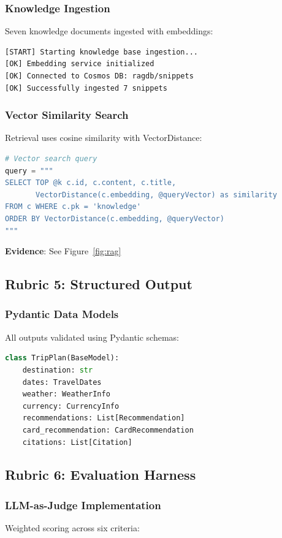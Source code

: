 \documentclass[11pt,a4paper]{article}
\begin{document}
\subsubsection{Knowledge Ingestion}
Seven knowledge documents ingested with embeddings:
\begin{lstlisting}[basicstyle=\ttfamily\small]
[START] Starting knowledge base ingestion...
[OK] Embedding service initialized
[OK] Connected to Cosmos DB: ragdb/snippets
[OK] Successfully ingested 7 snippets
\end{lstlisting}

\subsubsection{Vector Similarity Search}
Retrieval uses cosine similarity with VectorDistance:
\begin{lstlisting}[language=Python]
# Vector search query
query = """
SELECT TOP @k c.id, c.content, c.title,
       VectorDistance(c.embedding, @queryVector) as similarity
FROM c WHERE c.pk = 'knowledge'
ORDER BY VectorDistance(c.embedding, @queryVector)
"""
\end{lstlisting}
\textbf{Evidence}: See Figure~\ref{fig:rag}

\subsection{Rubric 5: Structured Output}

\subsubsection{Pydantic Data Models}
All outputs validated using Pydantic schemas:

\begin{lstlisting}[language=Python]
class TripPlan(BaseModel):
    destination: str
    dates: TravelDates
    weather: WeatherInfo
    currency: CurrencyInfo
    recommendations: List[Recommendation]
    card_recommendation: CardRecommendation
    citations: List[Citation]
\end{lstlisting}

\subsection{Rubric 6: Evaluation Harness}

\subsubsection{LLM-as-Judge Implementation}
Weighted scoring across six criteria:
\end{document}

